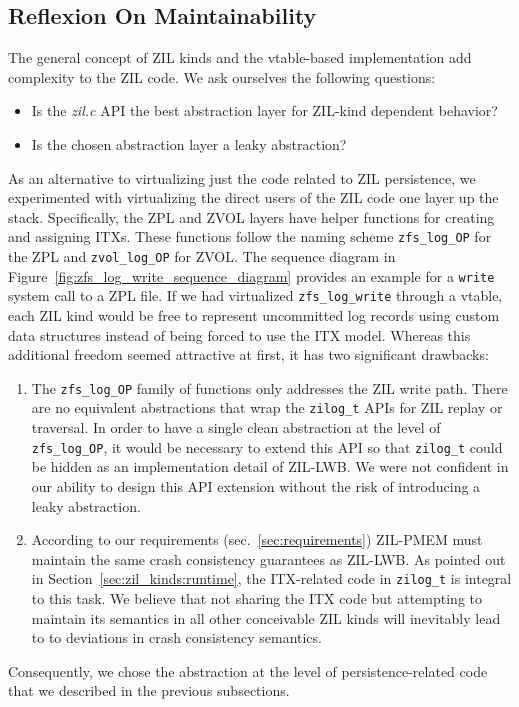 \documentclass[12pt,a4paper,twoside]{book}
\begin{document}
\subsection{Reflexion On Maintainability}
The general concept of ZIL kinds and the vtable-based implementation add complexity to the ZIL code.
We ask ourselves the following questions:
\begin{itemize}[noitemsep]
    \item Is the \textit{zil.c} API the best abstraction layer for ZIL-kind dependent behavior?
    \item Is the chosen abstraction layer a leaky abstraction?
\end{itemize}
As an alternative to virtualizing just the code related to ZIL persistence, we experimented with virtualizing the direct users of the ZIL code one layer up the stack.
Specifically, the ZPL and ZVOL layers have helper functions for creating and assigning ITXs.
These functions follow the naming scheme \lstinline{zfs_log_OP} for the ZPL and \lstinline{zvol_log_OP} for ZVOL.
The sequence diagram in Figure~\ref{fig:zfs_log_write_sequence_diagram} provides an example for a \lstinline{write} system call to a ZPL file.
If we had virtualized \lstinline{zfs_log_write} through a vtable, each ZIL kind would be free to represent uncommitted log records using custom data structures instead of being forced to use the ITX model.
Whereas this additional freedom seemed attractive at first, it has two significant drawbacks:
\begin{enumerate}[noitemsep]
    \item The \lstinline{zfs_log_OP} family of functions only addresses the ZIL write path.
        There are no equivalent abstractions that wrap the \lstinline{zilog_t} APIs for ZIL replay or traversal.
        In order to have a single clean abstraction at the level of \lstinline{zfs_log_OP}, it would be necessary to extend this API so that \lstinline{zilog_t} could be hidden as an implementation detail of ZIL-LWB.
        We were not confident in our ability to design this API extension without the risk of introducing a leaky abstraction.
    \item According to our requirements (sec.~\ref{sec:requirements}) ZIL-PMEM must maintain the same crash consistency guarantees as ZIL-LWB.
        As pointed out in Section~\ref{sec:zil_kinds:runtime}, the ITX-related code in \lstinline{zilog_t} is integral to this task.
        We believe that not sharing the ITX code but attempting to maintain its semantics in all other conceivable ZIL kinds will inevitably lead to to deviations in crash consistency semantics.
\end{enumerate}
Consequently, we chose the abstraction at the level of persistence-related code that we described in the previous subsections.
\end{document}
